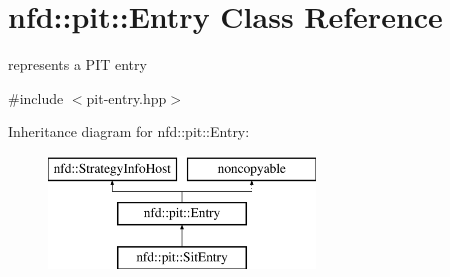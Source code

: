 \hypertarget{classnfd_1_1pit_1_1Entry}{}\section{nfd\+:\+:pit\+:\+:Entry Class Reference}
\label{classnfd_1_1pit_1_1Entry}


represents a P\+IT entry  




{\ttfamily \#include $<$pit-\/entry.\+hpp$>$}

Inheritance diagram for nfd\+:\+:pit\+:\+:Entry\+:\begin{figure}[H]
\begin{center}
\leavevmode
\includegraphics[height=3.000000cm]{classnfd_1_1pit_1_1Entry}
\end{center}
\end{figure}
